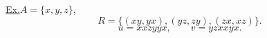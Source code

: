 \bigskip
\noindent\underline{Ex.}\quad $A=\{x,y,z\}$,
\[
R=\bigl\{(xy,yx),(yz,zy),(zx,xz)\bigr\}.
\]
\[
u=xxzyyx,\qquad v=yzxxyx.
\]
